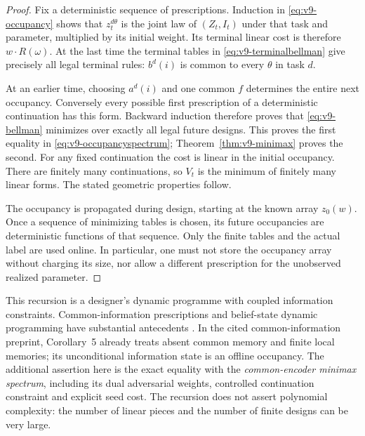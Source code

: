 \begin{proof}
Fix a deterministic sequence of prescriptions. Induction in
\eqref{eq:v9-occupancy} shows that $z_t^{d\theta}$ is the joint law of
$(Z_t,I_t)$ under that task and parameter, multiplied by its initial
weight. Its terminal linear cost is therefore $w\cdot R(\omega)$.
At the last time the terminal tables in
\eqref{eq:v9-terminalbellman} give precisely all legal terminal rules:
$b^d(i)$ is common to every $\theta$ in task $d$.

At an earlier time, choosing $a^d(i)$ and one common $f$ determines the
entire next occupancy. Conversely every possible first prescription of
a deterministic continuation has this form. Backward induction therefore
proves that \eqref{eq:v9-bellman} minimizes over exactly all legal future
designs. This proves the first equality in
\eqref{eq:v9-occupancyspectrum}; Theorem~\ref{thm:v9-minimax} proves the
second. For any fixed continuation the cost is linear in the initial
occupancy. There are finitely many continuations, so $V_t$ is the minimum
of finitely many linear forms. The stated geometric properties follow.

The occupancy is propagated during design, starting at the known array
$z_0(w)$. Once a sequence of minimizing tables is chosen, its future
occupancies are deterministic functions of that sequence. Only the
finite tables and the actual label are used online. In particular,
one must not store the occupancy array without charging its size, nor
allow a different prescription for the unobserved realized parameter.
\end{proof}

This recursion is a designer's dynamic programme with coupled information
constraints. Common-information prescriptions and belief-state dynamic
programming have substantial antecedents
\cite{NayyarMahajanTeneketzis2013,Witsenhausen1979}.
In the cited common-information preprint, Corollary~5 already treats
absent common memory and finite local memories; its unconditional
information state is an offline occupancy. The additional assertion
here is the exact equality with the
\emph{common-encoder minimax spectrum}, including its dual adversarial
weights, controlled continuation constraint and explicit seed cost.
The recursion does not assert polynomial complexity: the number of
linear pieces and the number of finite designs can be very large.

